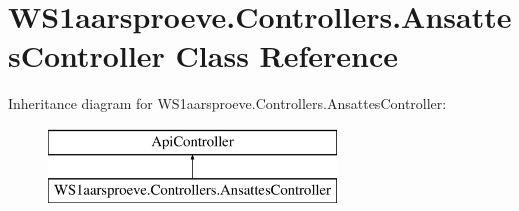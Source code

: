 \hypertarget{class_w_s1aarsproeve_1_1_controllers_1_1_ansattes_controller}{}\section{W\+S1aarsproeve.\+Controllers.\+Ansattes\+Controller Class Reference}
\label{class_w_s1aarsproeve_1_1_controllers_1_1_ansattes_controller}
Inheritance diagram for W\+S1aarsproeve.\+Controllers.\+Ansattes\+Controller\+:\begin{figure}[H]
\begin{center}
\leavevmode
\includegraphics[height=2.000000cm]{class_w_s1aarsproeve_1_1_controllers_1_1_ansattes_controller}
\end{center}
\end{figure}
